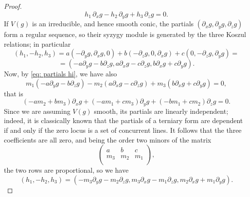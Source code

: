 \documentclass[a4paper, 11pt, reqno]{amsart}
\theoremstyle{plain}
\theoremstyle{definition}
\newcommand{\de}{\partial}
\begin{document}
\begin{proof}
\[
 h_1 \, \de_x g - h_2\, \de_y g +h_3 \, \de_z g=0.
\]
If $V(g)$ is an irreducible, and hence smooth conic, the partials 
$(\de_x g, \de_y g,\de_z g)$ form a regular sequence, so their syzygy module is generated by the three Koszul relations; in particular
\[
(h_1,-h_2,h_3)=a(-\de_y g, \de_x g,0) + b (-\de_z g, 0, \de_x g) + c(0,-\de_z g, \de_y g)
=
\]
\[
=(-a\de_y g -b\de_z g, a\de_x g -c\de_z g, b\de_x g+c\de_y g).
\]
Now, by \eqref{eq: partials hi}, we have also
\[
m_1 (-a\de_y g -b\de_z g)-m_2(a\de_x g -c\de_z g)+m_3(b\de_x g+c\de_y g)=0,
\]
that is
\[
(-am_2+bm_3)\de_x g +(-am_1+cm_3)\de_y g +(-bm_1+cm_2)\de_zg=0.
\]
Since we are assuming $V(g)$ smooth, its partials are linearly independent; indeed, it is classically known that the partials of a terniary form are dependent if and only if 
the zero locus is a set of concurrent lines.
It follows that the three coefficients are all zero, and being the order two minors of the matrix
\[
\begin{pmatrix}
    a&b&c\\
    m_3 & m_2 &m_1\\
\end{pmatrix},
\]
the two rows are proportional, so we have
\[
(h_1,-h_2,h_3)=(-m_3\de_y g -m_2\de_z g, m_3\de_x g -m_1\de_z g, m_2\de_x g+m_1\de_y g).
\]
\end{proof}



\end{document}
